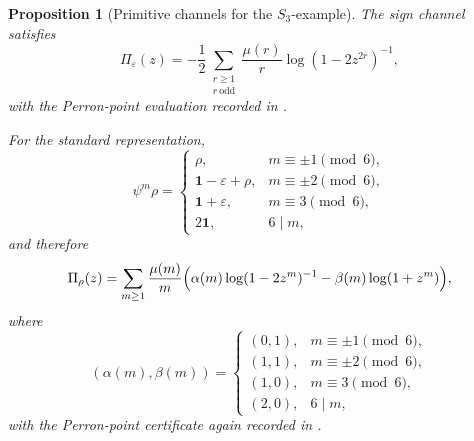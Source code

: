 \documentclass[11pt,a4paper]{amsart}
\theoremstyle{plain}
\newtheorem{proposition}[theorem]{Proposition}
\theoremstyle{definition}
\theoremstyle{remark}
\begin{document}
\begin{proposition}[Primitive channels for the \(S_3\)-example]
  \label{prop:s3-example-primitive-channels}
  The sign channel satisfies
  \begin{equation}\label{eq:s3-example-pi-eps}
    \Pi_\varepsilon(z)
    =
    -\frac12
      \sum_{\substack{r\ge 1\\ r\ \mathrm{odd}}}
        \frac{\mu(r)}{r}\log(1-2z^{2r})^{-1},
  \end{equation}
  with the Perron-point evaluation recorded in
  .

  For the standard representation,
  \begin{equation}\label{eq:s3-example-adams-rho}
    \psi^m\rho=
    \begin{cases}
      \rho, & m\equiv \pm 1 \pmod 6, \\
      \mathbf 1-\varepsilon+\rho, & m\equiv \pm 2 \pmod 6, \\
      \mathbf 1+\varepsilon, & m\equiv 3 \pmod 6, \\
      2\mathbf 1, & 6\mid m,
    \end{cases}
  \end{equation}
  and therefore
  \begin{equation}\label{eq:s3-example-pi-rho}
    \Pi_\rho(z)
    =
    \sum_{m\ge 1}\frac{\mu(m)}{m}
      \Bigl(
        \alpha(m)\log(1-2z^m)^{-1}
        -\beta(m)\log(1+z^m)
      \Bigr),
  \end{equation}
  where
  \begin{equation}\label{eq:s3-example-alpha-beta}
    (\alpha(m),\beta(m))=
    \begin{cases}
      (0,1), & m\equiv \pm 1 \pmod 6, \\
      (1,1), & m\equiv \pm 2 \pmod 6, \\
      (1,0), & m\equiv 3 \pmod 6, \\
      (2,0), & 6\mid m,
    \end{cases}
  \end{equation}
  with the Perron-point certificate again recorded in
  .
\end{proposition}
\end{document}
